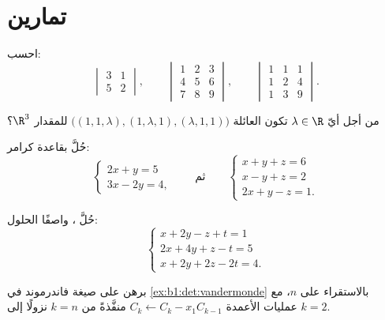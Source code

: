 \section{تمارين}

\begin{exercise}[$\star$]\label{exo:b1:det:1}
احسب:
\[
\begin{vmatrix} 3 & 1\\ 5 & 2 \end{vmatrix},
\qquad
\begin{vmatrix} 1 & 2 & 3\\ 4 & 5 & 6\\ 7 & 8 & 9\end{vmatrix},
\qquad
\begin{vmatrix} 1 & 1 & 1\\ 1 & 2 & 4\\ 1 & 3 & 9\end{vmatrix}.
\]
\end{exercise}

\begin{exercise}[$\star$]\label{exo:b1:det:2}
من أجل أيّ $\lambda \in \R$ تكون العائلة $\bigl((1, 1, \lambda),
(1, \lambda, 1), (\lambda, 1, 1)\bigr)$  للمقدار $\R^3$؟
\end{exercise}

\begin{exercise}[$\star$]\label{exo:b1:det:3}
حُلَّ بقاعدة كرامر:
\[
\begin{cases}
2x + y = 5\\
3x - 2y = 4 ,
\end{cases}
\qquad\text{ثم}\qquad
\begin{cases}
x + y + z = 6\\
x - y + z = 2\\
2x + y - z = 1 .
\end{cases}
\]
\end{exercise}

\begin{exercise}[$\star$]\label{exo:b1:det:4}
حُلَّ ، واصفًا  الحلول:
\[
\begin{cases}
x + 2y - z + t = 1\\
2x + 4y + z - t = 5\\
x + 2y + 2z - 2t = 4 .
\end{cases}
\]
\end{exercise}

\begin{exercise}[$\star\star$]\label{exo:b1:det:5}
برهن على صيغة فاندرموند في \cref{ex:b1:det:vandermonde}
بالاستقراء على $n$، مع عمليات الأعمدة $C_k \leftarrow C_k -
x_1 C_{k-1}$ منفَّذةً من $k = n$ نزولًا إلى $k = 2$.
\end{exercise}

